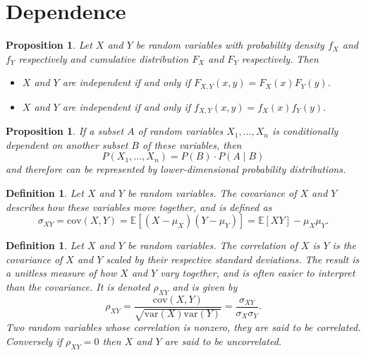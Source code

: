 \documentclass[1pt]{report}
\newtheorem{prop}[thm]{Proposition}
\newtheorem{defn}[thm]{Definition}
\newcommand{\<}{\langle}
\renewcommand{\>}{\rangle}
\newcommand{\E}{\mathbb{E}}
\newcommand{\cov}{\text{cov}}
\begin{document}
\section{Dependence}
\begin{prop}\label{prop:independentjointdistribution}
Let $X$ and $Y$ be random variables with probability density $f_X$ and $f_Y$ respectively and cumulative distribution $F_X$ and $F_Y$ respectively. Then
\begin{itemize}
\item $X$ and $Y$ are independent if and only if $F_{X,Y}(x,y) = F_X(x) F_Y(y)$.
\item $X$ and $Y$ are independent if and only if $f_{X,Y}(x,y) = f_X(x)f_Y(y)$.
\end{itemize}
\end{prop}
\begin{prop}\label{prop:jointconditionallydependent}
If a subset $A$ of random variables $X_1, \dots, X_n$ is conditionally dependent on another subset $B$ of these variables, then
$$P(X_1, \dots, X_n) = P(B)\cdot P(A\mid B)$$
and therefore can be represented by lower-dimensional probability distributions.
\end{prop}
\begin{defn}\label{def:covariance}
Let $X$ and $Y$ be random variables. The \emph{covariance} of $X$ and $Y$ describes how these variables move together, and is defined as
$$\sigma_{XY} = \cov(X,Y) = \E[(X-\mu_X)(Y-\mu_Y)] = \E[XY] - \mu_X\mu_Y.$$
\end{defn}
\begin{defn}\label{def:correlation}
Let $X$ and $Y$ be random variables. The \emph{correlation} of $X$ is $Y$ is the covariance of $X$ and $Y$ scaled by their respective standard deviations. The result is a unitless measure of how $X$ and $Y$ vary together, and is often easier to interpret than the covariance. It is denoted $\rho_{XY}$ and is given by
$$\rho_{XY} = \dfrac{\cov(X,Y)}{\sqrt{\text{var}(X) \text{var}(Y)}} = \dfrac{\sigma_{XY}}{\sigma_X \sigma_Y}.$$
Two random variables whose correlation is nonzero, they are said to be \emph{correlated}. Conversely if $\rho_{XY} = 0$ then $X$ and $Y$ are said to be \emph{uncorrelated}.
\end{defn}
\end{document}
